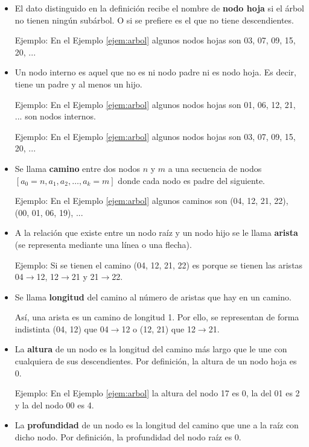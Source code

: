 \begin{itemize}
\item 
El dato distinguido en la definición recibe el nombre de \textbf{nodo hoja} si el árbol no tienen ningún subárbol.
O si se prefiere es el que no tiene descendientes.

Ejemplo: En el Ejemplo \ref{ejem:arbol} algunos nodos hojas son 03, 07, 09, 15, 20, ...

\item 
Un nodo interno es aquel que no es ni nodo padre ni es nodo  hoja. Es decir, tiene un padre y al menos un hijo.

Ejemplo: En el Ejemplo \ref{ejem:arbol} algunos nodos hojas son 01, 06, 12, 21, ... son nodos internos.



Ejemplo: En el Ejemplo \ref{ejem:arbol} algunos nodos hojas son 03, 07, 09, 15, 20, ...

\item Se llama \textbf{camino} entre dos nodos $n$ y $m$ a una secuencia de nodos $[a_0=n, a_1, a_2, \ldots, a_k=m]$ donde cada nodo es padre del siguiente.

Ejemplo: En el Ejemplo \ref{ejem:arbol} algunos caminos son (04, 12, 21, 22), (00, 01, 06, 19), ...

\item A la relación que existe entre un nodo raíz y un nodo hijo se le llama \textbf{arista} (se representa mediante una línea o una flecha). 

Ejemplo: Si se tienen el camino (04, 12, 21, 22) es porque se tienen las aristas 04$\rightarrow$12, 12$\rightarrow$21 y 21$\rightarrow$22.


\item Se llama \textbf{longitud} del camino al número de aristas que hay en un camino. 

Así, una arista es un camino de longitud 1. Por ello, se representan de forma indistinta (04, 12) que  04$\rightarrow$12 o (12, 21) que 12$\rightarrow$21.

\item La \textbf{altura} de un nodo es la longitud del camino más largo que le une con cualquiera de sus descendientes. Por definición, la altura de un nodo hoja es 0.

Ejemplo: En el Ejemplo \ref{ejem:arbol} la altura del nodo 17 es 0, la del 01 es 2 y la del nodo 00 es 4.


\item La \textbf{profundidad} de un nodo es la longitud del camino que une a la raíz con dicho nodo.
Por definición, la profundidad del nodo raíz es 0.


\end{itemize}
